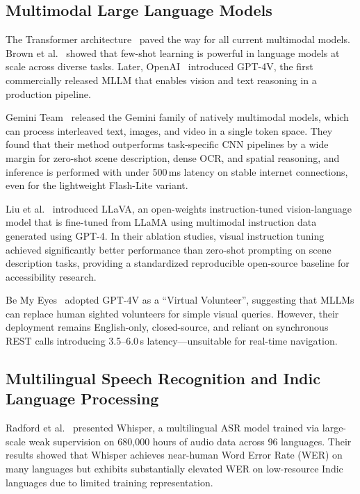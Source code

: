 \documentclass[pdflatex,sn-mathphys-num]{sn-jnl}
\theoremstyle{thmstyleone}%
\theoremstyle{thmstyletwo}%
\theoremstyle{thmstylethree}%
\begin{document}
\subsection{Multimodal Large Language Models}
The Transformer architecture~\cite{vaswani2017attention} paved the way for all current multimodal models. Brown et al.~\cite{brown2020gpt3} showed that few-shot learning is powerful in language models at scale across diverse tasks. Later, OpenAI~\cite{openai2023gpt4} introduced GPT-4V, the first commercially released MLLM that enables vision and text reasoning in a production pipeline.

Gemini Team~\cite{team2023gemini} released the Gemini family of natively multimodal models, which can process interleaved text, images, and video in a single token space. They found that their method outperforms task-specific CNN pipelines by a wide margin for zero-shot scene description, dense OCR, and spatial reasoning, and inference is performed with under 500\,ms latency on stable internet connections, even for the lightweight Flash-Lite variant.

Liu et al.~\cite{liu2024llava} introduced LLaVA, an open-weights instruction-tuned vision-language model that is fine-tuned from LLaMA using multimodal instruction data generated using GPT-4. In their ablation studies, visual instruction tuning achieved significantly better performance than zero-shot prompting on scene description tasks, providing a standardized reproducible open-source baseline for accessibility research.

Be My Eyes~\cite{bemyeyes2021} adopted GPT-4V as a ``Virtual Volunteer'', suggesting that MLLMs can replace human sighted volunteers for simple visual queries. However,
their deployment remains English-only, closed-source, and reliant on synchronous REST
calls introducing 3.5--6.0\,s latency---unsuitable for real-time navigation.

\subsection{Multilingual Speech Recognition and Indic Language Processing}

Radford et al.~\cite{radford2023whisper} presented Whisper, a multilingual ASR model
trained via large-scale weak supervision on 680,000 hours of audio data across 96 languages.
Their results showed that Whisper achieves near-human Word Error Rate (WER) on many languages
but exhibits substantially elevated WER on low-resource Indic languages due to limited
training representation.
\end{document}
